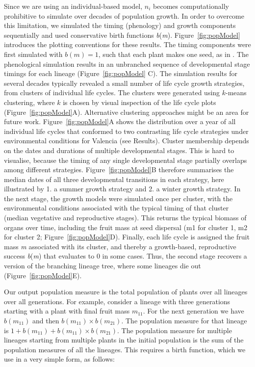 Since we are using an individual-based model, \(n_{i}\) becomes computationally
prohibitive to simulate over decades of population growth. In order to overcome
this limitation, we simulated the timing (phenology) and growth components
sequentially and used conservative birth functions
\emph{b}(\emph{m}). Figure~\ref{fig:popModel} introduces the plotting
conventions for these results. The timing components were first simulated with
\(b(m) = 1\), such that each plant makes one seed, as in
\citet{burghardt_modeling_2015}. The phenological simulation results in an
unbranched sequence of developmental stage timings for each lineage (Figure~\ref{fig:popModel}
C). The simulation results for several decades typically revealed a small
number of life cycle growth strategies, from clusters of individual life
cycles. The clusters were generated using \(k\)-means clustering, where \(k\) is
chosen by visual inspection of the life cycle plots
(Figure~\ref{fig:popModel}A). Alternative clustering approaches might be an area
for future work. Figure~\ref{fig:popModel}A shows the distribution over a year
of all individual life cycles that conformed to two contrasting life cycle
strategies under environmental conditions for Valencia (see Results).  Cluster
membership depends on the dates and durations of multiple developmental
stages. This is hard to visualise, because the timing of any single
developmental stage partially overlaps among different
strategies. Figure~\ref{fig:popModel}B therefore summarises the median dates of
all three developmental transitions in each strategy, here illustrated by 1. a
summer growth strategy and 2. a winter growth strategy. In the next stage, the
growth models were simulated once per cluster, with the environmental conditions
associated with the typical timing of that cluster (median vegetative and
reproductive stages). This returns the typical biomass of organs over time,
including the fruit mass at seed dispersal (m1 for cluster 1, m2 for cluster 2;
Figure~\ref{fig:popModel}D). Finally, each life cycle is assigned the fruit mass
\emph{m} associated with its cluster, and thereby a growth-based, reproductive
success \emph{b}(\emph{m}) that evaluates to 0 in some cases. Thus, the second
stage recovers a version of the branching lineage tree, where some lineages die
out (Figure~\ref{fig:popModel}E).

Our output population measure is the total population of plants over all
lineages over all generations. For example, consider a lineage with
three generations starting with a plant with final fruit mass
\(m_{11}\). For the next generation we have \(b(m_{11})\) and then
\(b(m_{11}) \times b(m_{21})\). The population measure for that lineage
is \(1 + b(m_{11}) + b(m_{11}) \times b(m_{21})\). The population
measure for multiple lineages starting from multiple plants in the
initial population is the sum of the population measures of all the
lineages. This requires a birth function, which we use in a very simple
form, as follows:

